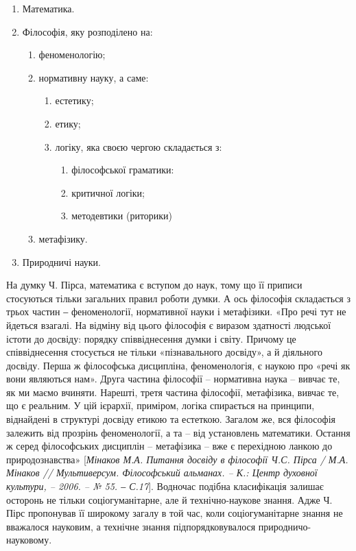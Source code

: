 \begin{enumerate}[label=\Roman*]
	\item Математика.

	\item Філософія, яку розподілено на:
	\begin{enumerate}[label=\arabic*)]
		\item феноменологію;
		
		\item нормативну науку, а саме:
		\begin{enumerate}[label=2.\arabic*)]
			\item естетику;

			\item етику;
			
			\item логіку, яка своєю чергою складається з:
			\begin{enumerate}[label=\alph*)]
				\item філософської граматики:
				
				\item критичної логіки;

				\item методевтики (риторики)			
			\end{enumerate}
		\end{enumerate}
			
		\item метафізику.	
	\end{enumerate}

	\item Природничі науки.
\end{enumerate}

На думку Ч. Пірса, математика є вступом до наук, тому що її приписи
стосуються тільки загальних правил роботи думки. А ось філософія складається
з трьох частин ‒ феноменології, нормативної науки і метафізики. «Про речі тут
не йдеться взагалі. На відміну від цього філософія є виразом здатності людської
істоти до досвіду: порядку співвіднесення думки і світу. Причому це
співвіднесення стосується не тільки «пізнавального досвіду», а й діяльного
досвіду. Перша ж філософська дисципліна, феноменологія, є наукою про «речі
як вони являються нам». Друга частина філософії – нормативна наука – вивчає
те, як ми маємо вчиняти. Нарешті, третя частина філософії, метафізика, вивчає
те, що є реальним. У цій ієрархії, приміром, логіка спирається на принципи,
віднайдені в структурі досвіду етикою та естеткою. Загалом же, вся філософія
залежить від прозрінь феноменології, а та – від установлень математики.
Остання ж серед філософських дисциплін – метафізика – вже є перехідною
ланкою до природознавства» [\textit{Мінаков М.А. Питання досвіду в філософії Ч.С.
Пірса / М.А. Мінаков // Мультиверсум. Філософський альманах. – К.: Центр
духовної культури, – 2006. – № 55. ‒ С.17}]. Водночас подібна класифікація
залишає осторонь не тільки соціогуманітарне, але й технічно-наукове знання.
Адже Ч. Пірс пропонував її широкому загалу в той час, коли соціогуманітарне
знання не вважалося науковим, а технічне знання підпорядковувалося
природничо-науковому.

